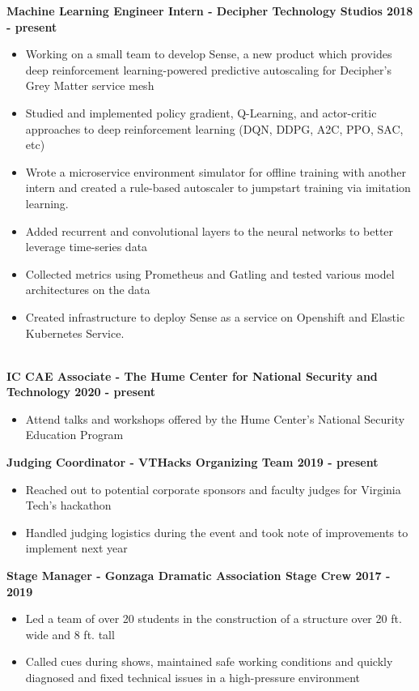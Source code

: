 \documentclass{article}
\begin{document}
\begin{center}
\begin{flushleft}
    \textbf{Machine Learning Engineer Intern - Decipher Technology Studios \hfill 2018 - present}
    \begin{itemize}
      \itemsep0em
      \item Working on a small team to develop Sense, a new product which provides deep reinforcement learning-powered predictive autoscaling for Decipher’s Grey Matter service mesh
      \item Studied and implemented policy gradient, Q-Learning, and actor-critic approaches to deep reinforcement learning (DQN, DDPG, A2C, PPO, SAC, etc)
      \item Wrote a microservice environment simulator for offline training with another intern and created a rule-based autoscaler to jumpstart training via imitation learning.
      \item Added recurrent and convolutional layers to the neural networks to better leverage time-series data
      \item Collected metrics using Prometheus and Gatling and tested various model architectures on the data
      \item Created infrastructure to deploy Sense as a service on Openshift and Elastic Kubernetes Service.
    \end{itemize}


    {\large\textbf{\underline{}}} \\

    \textbf{IC CAE Associate - The Hume Center for National Security and Technology \hfill 2020 - present}
    \begin{itemize}
      \itemsep0em
      \item Attend talks and workshops offered by the Hume Center's National Security Education Program 
    \end{itemize}
    
    \textbf{Judging Coordinator - VTHacks Organizing Team \hfill 2019 - present}
    \begin{itemize}
      \itemsep0em
      \item Reached out to potential corporate sponsors and faculty judges for Virginia Tech's hackathon
      \item Handled judging logistics during the event and took note of improvements to implement next year
    \end{itemize}
    
    \textbf{Stage Manager - Gonzaga Dramatic Association Stage Crew \hfill 2017 - 2019}
    \begin{itemize}
      \itemsep0em
      \item Led a team of over 20 students in the construction of a structure over 20 ft. wide and 8 ft. tall
      \item Called cues during shows, maintained safe working conditions and quickly diagnosed and fixed technical issues in a high-pressure environment
    \end{itemize}


\end{flushleft}
\end{center}
\end{document}
